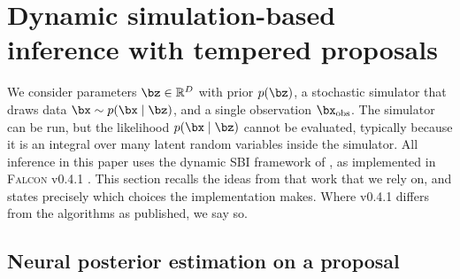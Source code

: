 

\section{Dynamic simulation-based inference with tempered proposals}
\label{sec:dsbi}

We consider parameters $\bz\in\mathbb{R}^{D}$ with prior $p(\bz)$, a
stochastic simulator that draws data $\bx\sim p(\bx\mid\bz)$, and a single
observation $\bx_{\mathrm{obs}}$. The simulator can be run, but the likelihood
$p(\bx\mid\bz)$ cannot be evaluated, typically because it is an integral over
many latent random variables inside the simulator. All inference in this
paper uses the dynamic SBI framework of \citet{lyu_dynamic_2026}, as
implemented in \textsc{Falcon} v0.4.1 \citep{falcon_note}. This section
recalls the ideas from that work that we rely on, and states precisely which
choices the implementation makes. Where v0.4.1 differs from the algorithms as
published, we say so.

\subsection{Neural posterior estimation on a proposal}
\label{sec:ds-proposal}

